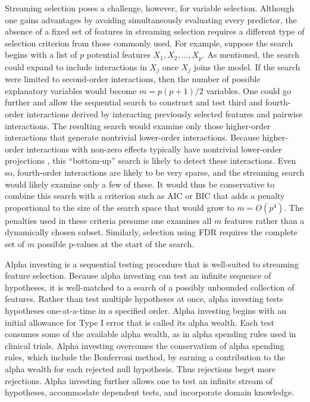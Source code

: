 \documentclass{gSCS2e}
\begin{document}
 Streaming selection poses a challenge, however, for variable selection.  Although one
 gains advantages by avoiding simultaneously evaluating every predictor, the absence of a
 fixed set of features in streaming selection requires a different type of selection
 criterion from those commonly used.  For example, suppose the search begins with a list
 of $p$ potential features $X_1, X_2, \ldots, X_p$.  As mentioned, the search could expand
 to include interactions in $X_j$ once $X_j$ joins the model.  If the search were limited
 to second-order interactions, then the number of possible explanatory variables would
 become $m = p(p+1)/2$ variables.  One could go further and allow the sequential search to
 construct and test third and fourth-order interactions derived by interacting previously
 selected features and pairwise interactions. The resulting search would examine only
 those higher-order interactions that generate nontrivial lower-order
 interactions. Because higher-order interactions with non-zero effects typically have
 nontrivial lower-order projections \citep{kalai09}, this ``bottom-up'' search is likely
 to detect these interactions.  Even so, fourth-order interactions are likely to be very
 sparse, and the streaming search would likely examine only a few of these.  It would thus
 be conservative to combine this search with a criterion such as AIC or BIC that adds a
 penalty proportional to the size of the search space that would grow to $m = O(p^4)$.
  The penalties used in these criteria presume one examines all $m$ features rather than a
 dynamically chosen subset.  Similarly, selection using FDR requires the complete set of
 $m$ possible p-values at the start of the search.


 Alpha investing \citep{fosterstine08} is a sequential testing procedure
 that is well-suited to streaming feature selection.  Because alpha investing can
 test an infinite sequence of hypotheses, it is well-matched to a search of a
 possibly unbounded collection of features.  Rather than test multiple
 hypotheses at once, alpha investing tests hypotheses one-at-a-time in a
 specified order.  Alpha investing begins with an initial allowance for Type I
 error that is called its alpha wealth.  Each test consumes some of the
 available alpha wealth, as in alpha spending rules used in clinical trials.
  Alpha investing overcomes the conservatism of alpha spending rules, which
 include the Bonferroni method, by earning a contribution to the alpha wealth
 for each rejected null hypothesis.  Thus rejections beget more rejections.
  Alpha investing further allows one to test an infinite stream of hypotheses,
 accommodate dependent tests, and incorporate domain knowledge.
 
\end{document}
